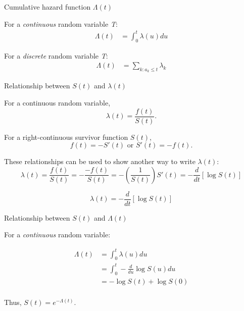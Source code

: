 \documentclass[ignorenonframetext,]{beamer}
\begin{document}
\begin{frame}{%
\protect\hypertarget{cumulative-hazard-function-lambdat}{%
Cumulative hazard function \(\Lambda(t)\)}}

For a \emph{continuous} random variable \emph{T}: \begin{align*}
\Lambda(t)  &=\int_0^t \lambda(u) du
\end{align*}

For a \emph{discrete} random variable \emph{T}: \begin{align*}
\Lambda(t) &= \sum_{k:a_k \leq t} \lambda_k
\end{align*}

\end{frame}

\begin{frame}{%
\protect\hypertarget{relationship-between-st-and-lambdat}{%
Relationship between \(S(t)\) and \(\lambda(t)\)}}

For a continuous random variable, \[
\lambda(t)=\frac{f(t)}{S(t)}.
\]

For a right-continuous survivor function \(S(t)\), \[
f(t) = -S'(t) \text{ or } S'(t) = -f(t).
\]

These relationships can be used to show another way to write
\(\lambda(t)\): \[
\lambda(t) = \frac{f(t)}{S(t)} = - \frac{-f(t)}{S(t)} = - \left(\frac{1}{S(t)} \right) S'(t) = - \frac{d}{dt} [\log S(t)]
\]

\[
\lambda(t)= - \frac{d}{dt} [\log S(t)]
\]

\end{frame}

\begin{frame}{%
\protect\hypertarget{relationship-between-st-and-lambdat-1}{%
Relationship between \(S(t)\) and \(\Lambda(t)\)}}

For a \emph{continuous} random variable:

\begin{align*}
\Lambda(t) &= \int_0^t \lambda(u)du \\
&= \int_0^t -\frac{d}{du} \log S(u) du \\
&= -\log S(t)+\log S(0)\\
\end{align*}

Thus, \(S(t)=e^{-\Lambda(t)}\).

\end{frame}
\end{document}
